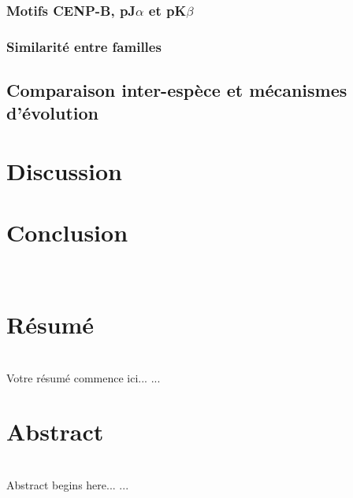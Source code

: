 \documentclass[12pt,a4paper]{article}
\begin{document}
			\subsubsection{Motifs CENP-B, pJ$\alpha$ et pK$\beta$}
			\subsubsection{Similarité entre familles}
	
	\subsection{Comparaison inter-espèce et mécanismes d'évolution}


\section{Discussion}
\section{Conclusion}

\newpage
\strut  ~  \mbox{}  \null
\newpage

  

%
% 
%
%
%
% 
% 

\newpage 
\thispagestyle{empty}
\section*{Résumé}~\\[0.2cm]
Votre résumé commence ici...
   ...
\section*{Abstract}~\\[0.2cm]
 Abstract begins here...
   ...
\end{document}
